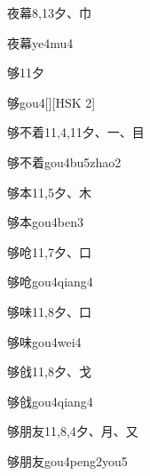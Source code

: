 \begin{entry}{夜幕}{8,13}{⼣、⼱}
  \begin{phonetics}{夜幕}{ye4mu4}
  \end{phonetics}
\end{entry}

\begin{entry}{够}{11}{⼣}
  \begin{phonetics}{够}{gou4}[][HSK 2]
  \end{phonetics}
\end{entry}

\begin{entry}{够不着}{11,4,11}{⼣、⼀、⽬}
  \begin{phonetics}{够不着}{gou4bu5zhao2}
  \end{phonetics}
\end{entry}

\begin{entry}{够本}{11,5}{⼣、⽊}
  \begin{phonetics}{够本}{gou4ben3}
  \end{phonetics}
\end{entry}

\begin{entry}{够呛}{11,7}{⼣、⼝}
  \begin{phonetics}{够呛}{gou4qiang4}
  \end{phonetics}
\end{entry}

\begin{entry}{够味}{11,8}{⼣、⼝}
  \begin{phonetics}{够味}{gou4wei4}
  \end{phonetics}
\end{entry}

\begin{entry}{够戗}{11,8}{⼣、⼽}
  \begin{phonetics}{够戗}{gou4qiang4}
  \end{phonetics}
\end{entry}

\begin{entry}{够朋友}{11,8,4}{⼣、⽉、⼜}
  \begin{phonetics}{够朋友}{gou4peng2you5}
  \end{phonetics}
\end{entry}

